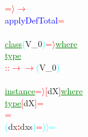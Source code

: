 \textcolor{red}{=\ensuremath{\rangle}}\hsspace \textcolor{red}{\ensuremath{\rightarrow}}\\\textcolor{blue}{applyDefTotal}\hsspace \textcolor{red}{=}\\\\\textcolor{green}{\underline{class}}\hsspace \textcolor{cyan}{(}{\rm{}V\_0}\textcolor{cyan}{)}\hsspace \textcolor{red}{=\ensuremath{\rangle}}\hsspace \textcolor{green}{\underline{where}}\\\hstab \textcolor{green}{\underline{type}}\\\hsspace \textcolor{red}{::}\hsspace \textcolor{red}{\ensuremath{\rightarrow}}\hsspace \textcolor{red}{\ensuremath{\rightarrow}}\hsspace \textcolor{cyan}{(}{\rm{}V\_0}\textcolor{cyan}{)}\\\\\textcolor{green}{\underline{instance}}\hsspace \textcolor{red}{=\ensuremath{\rangle}}\hsspace \textcolor{red}{[}{\rm{}dX}\textcolor{red}{]}\hsspace \textcolor{green}{\underline{where}}\\\hstab \textcolor{green}{\underline{type}}\hsspace \textcolor{red}{[}{\rm{}dX}\textcolor{red}{]}\hsspace \textcolor{red}{=}\\\hsspace {\rm{}[]}\hsspace \hsspace \hsspace \hsspace \hsspace \hsspace {}\hsspace \textcolor{red}{=}\\\hsspace \textcolor{cyan}{(}{\rm{}dx}\textcolor{red}{{\bf{}:}}{\rm{}dxs}\textcolor{cyan}{)}\hsspace \textcolor{red}{=}\hsspace \textcolor{cyan}{\ensuremath{\rangle}\ensuremath{\rangle}=}\\
